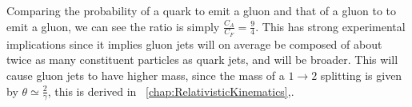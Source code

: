 Comparing the probability of a quark to emit a gluon and that of a gluon to to emit a gluon, we can see the ratio is simply $\frac{C_A}{C_F} =\frac{9}{4} $. This has strong experimental implications since it implies gluon jets will on average be composed of about twice as many constituent particles as quark jets, and will be broader. This will cause gluon jets to have higher mass, since the mass of a $1 \rightarrow 2 $ splitting is given by $\theta \simeq \frac{2}{\gamma} $, this is derived in ~\ref{chap:RelativisticKinematics},.




